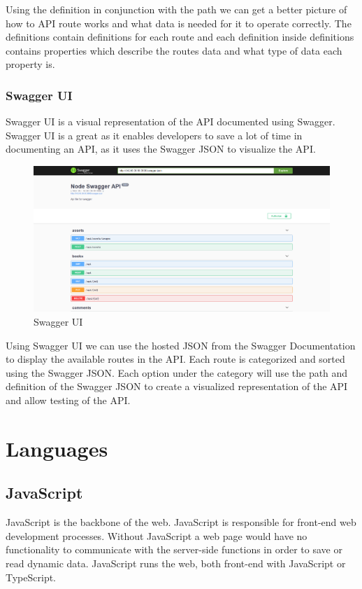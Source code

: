 Using the definition in conjunction with the path we can get a better picture of how to API route works and what data is needed for it to operate correctly. The definitions contain definitions for each route and each definition inside definitions contains properties which describe the routes data and what type of data each property is.

\subsubsection{Swagger UI}
Swagger UI is a visual representation of the API documented using Swagger. Swagger UI is a great as it enables developers to save a lot of time in documenting an API, as it uses the Swagger JSON to visualize the API. 

\begin{figure}[H]
  \includegraphics[width=\linewidth]{img/swaggerUI.PNG}
  \caption{Swagger UI}
  \label{fig:NPM}
\end{figure}

Using Swagger UI we can use the hosted JSON from the Swagger Documentation to display the available routes in the API. Each route is categorized and sorted using the Swagger JSON. Each option under the category will use the path and definition of the Swagger JSON to create a visualized representation of the API and allow testing of the API.

\section{Languages}
\subsection{JavaScript}
JavaScript is the backbone of the web. JavaScript is responsible for front-end web development processes. Without JavaScript a web page would have no functionality to communicate with the server-side functions in order to save or read dynamic data. JavaScript runs the web, both front-end with JavaScript or TypeScript. 

